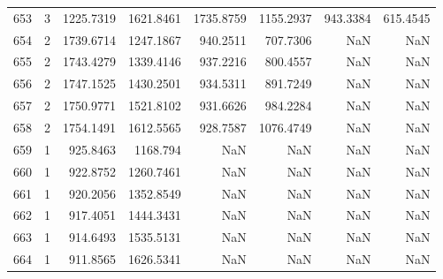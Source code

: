 \begin{table}[p]
\begin{tabular}{@{}rcrrrrrr@{}}
    653     & 3    & 1225.7319 & 1621.8461 & 1735.8759 & 1155.2937 & 943.3384 & 615.4545 \\
    654     & 2    & 1739.6714 & 1247.1867 & 940.2511  & 707.7306  & NaN      & NaN      \\
    655     & 2    & 1743.4279 & 1339.4146 & 937.2216  & 800.4557  & NaN      & NaN      \\
    656     & 2    & 1747.1525 & 1430.2501 & 934.5311  & 891.7249  & NaN      & NaN      \\
    657     & 2    & 1750.9771 & 1521.8102 & 931.6626  & 984.2284  & NaN      & NaN      \\
    658     & 2    & 1754.1491 & 1612.5565 & 928.7587  & 1076.4749 & NaN      & NaN      \\
    659     & 1    & 925.8463  & 1168.794  & NaN       & NaN       & NaN      & NaN      \\
    660     & 1    & 922.8752  & 1260.7461 & NaN       & NaN       & NaN      & NaN      \\
    661     & 1    & 920.2056  & 1352.8549 & NaN       & NaN       & NaN      & NaN      \\
    662     & 1    & 917.4051  & 1444.3431 & NaN       & NaN       & NaN      & NaN      \\
    663     & 1    & 914.6493  & 1535.5131 & NaN       & NaN       & NaN      & NaN      \\
    664     & 1    & 911.8565  & 1626.5341 & NaN       & NaN       & NaN      & NaN      \\ \bottomrule
    \end{tabular}
    \normalsize
    
    \label{table:Segmentierungsscript}
    \end{table}


